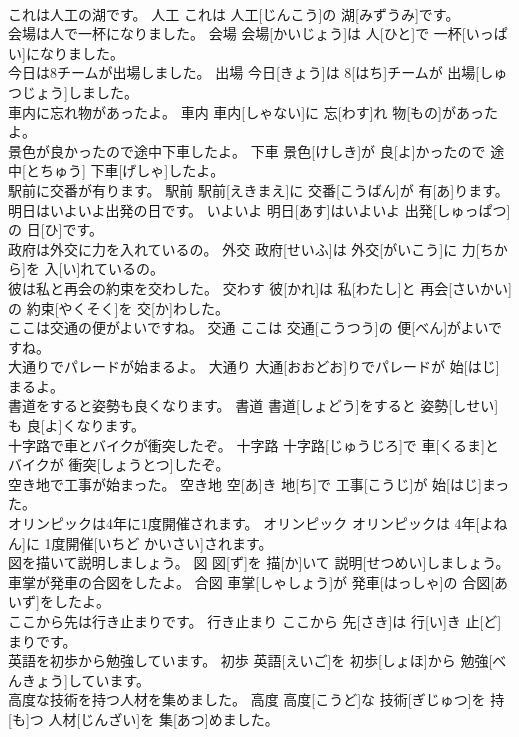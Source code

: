 \documentclass[8pt]{extreport}
\begin{document}
\begin{CJK}{UTF8}{min}
\\	これは人工の湖です。	人工	これは 人工[じんこう]の 湖[みずうみ]です。	
\\	会場は人で一杯になりました。	会場	会場[かいじょう]は 人[ひと]で 一杯[いっぱい]になりました。	
\\	今日は8チームが出場しました。	出場	今日[きょう]は 8[はち]チームが 出場[しゅつじょう]しました。	
\\	車内に忘れ物があったよ。	車内	車内[しゃない]に 忘[わす]れ 物[もの]があったよ。	
\\	景色が良かったので途中下車したよ。	下車	景色[けしき]が 良[よ]かったので 途中[とちゅう] 下車[げしゃ]したよ。	
\\	駅前に交番が有ります。	駅前	駅前[えきまえ]に 交番[こうばん]が 有[あ]ります。	
\\	明日はいよいよ出発の日です。	いよいよ	明日[あす]はいよいよ 出発[しゅっぱつ]の 日[ひ]です。	
\\	政府は外交に力を入れているの。	外交	政府[せいふ]は 外交[がいこう]に 力[ちから]を 入[い]れているの。	
\\	彼は私と再会の約束を交わした。	交わす	彼[かれ]は 私[わたし]と 再会[さいかい]の 約束[やくそく]を 交[か]わした。	
\\	ここは交通の便がよいですね。	交通	ここは 交通[こうつう]の 便[べん]がよいですね。	
\\	大通りでパレードが始まるよ。	大通り	大通[おおどお]りでパレードが 始[はじ]まるよ。	
\\	書道をすると姿勢も良くなります。	書道	書道[しょどう]をすると 姿勢[しせい]も 良[よ]くなります。	
\\	十字路で車とバイクが衝突したぞ。	十字路	十字路[じゅうじろ]で 車[くるま]とバイクが 衝突[しょうとつ]したぞ。	
\\	空き地で工事が始まった。	空き地	空[あ]き 地[ち]で 工事[こうじ]が 始[はじ]まった。	
\\	オリンピックは4年に1度開催されます。	オリンピック	オリンピックは 4年[よねん]に 1度開催[いちど かいさい]されます。	
\\	図を描いて説明しましょう。	図	図[ず]を 描[か]いて 説明[せつめい]しましょう。	
\\	車掌が発車の合図をしたよ。	合図	車掌[しゃしょう]が 発車[はっしゃ]の 合図[あいず]をしたよ。	
\\	ここから先は行き止まりです。	行き止まり	ここから 先[さき]は 行[い]き 止[ど]まりです。	
\\	英語を初歩から勉強しています。	初歩	英語[えいご]を 初歩[しょほ]から 勉強[べんきょう]しています。	
\\	高度な技術を持つ人材を集めました。	高度	高度[こうど]な 技術[ぎじゅつ]を 持[も]つ 人材[じんざい]を 集[あつ]めました。	

\end{CJK}
\end{document}
